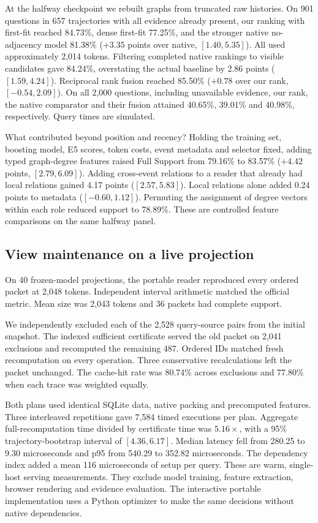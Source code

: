 \documentclass[conference]{IEEEtran}
\begin{document}
At the halfway checkpoint we rebuilt graphs from truncated raw histories. On 901 questions in 657 trajectories with all evidence already present, our ranking with first-fit reached 84.73\%, dense first-fit 77.25\%, and the stronger native no-adjacency model 81.38\% ($+3.35$ points over native, $[1.40,5.35]$). All used approximately 2,014 tokens. Filtering completed native rankings to visible candidates gave 84.24\%, overstating the actual baseline by 2.86 points ($[1.59,4.24]$). Reciprocal rank fusion reached 85.50\% ($+0.78$ over our rank, $[-0.54,2.09]$). On all 2,000 questions, including unavailable evidence, our rank, the native comparator and their fusion attained 40.65\%, 39.01\% and 40.98\%, respectively. Query times are simulated.

What contributed beyond position and recency? Holding the training set, boosting model, E5 scores, token costs, event metadata and selector fixed, adding typed graph-degree features raised Full Support from 79.16\% to 83.57\% ($+4.42$ points, $[2.79,6.09]$). Adding cross-event relations to a reader that already had local relations gained 4.17 points ($[2.57,5.83]$). Local relations alone added 0.24 points to metadata ($[-0.60,1.12]$). Permuting the assignment of degree vectors within each role reduced support to 78.89\%. These are controlled feature comparisons on the same halfway panel.


\subsection{View maintenance on a live projection}
On 40 frozen-model projections, the portable reader reproduced every ordered packet at 2,048 tokens. Independent interval arithmetic matched the official metric. Mean size was 2,043 tokens and 36 packets had complete support.

We independently excluded each of the 2,528 query-source pairs from the initial snapshot. The indexed sufficient certificate served the old packet on 2,041 exclusions and recomputed the remaining 487. Ordered IDs matched fresh recomputation on every operation. Three conservative recalculations left the packet unchanged. The cache-hit rate was 80.74\% across exclusions and 77.80\% when each trace was weighted equally.

Both plans used identical SQLite data, native packing and precomputed features. Three interleaved repetitions gave 7,584 timed executions per plan. Aggregate full-recomputation time divided by certificate time was $5.16\times$, with a 95\% trajectory-bootstrap interval of $[4.36,6.17]$. Median latency fell from 280.25 to 9.30 microseconds and p95 from 540.29 to 352.82 microseconds. The dependency index added a mean 116 microseconds of setup per query. These are warm, single-host serving measurements. They exclude model training, feature extraction, browser rendering and evidence evaluation. The interactive portable implementation uses a Python optimizer to make the same decisions without native dependencies.
\end{document}
